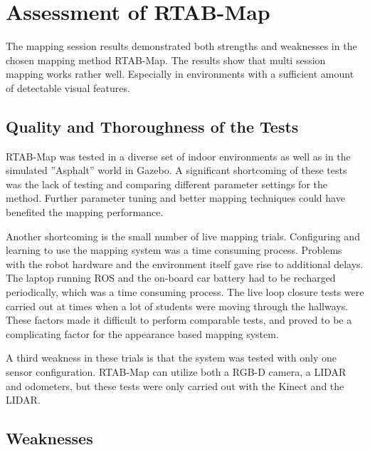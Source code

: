 \section{Assessment of RTAB-Map}

The mapping session results demonstrated both strengths and weaknesses  in the chosen mapping method \ac{RTAB-Map}. The results show that multi session mapping works rather well. Especially in environments with a sufficient amount of detectable visual features. 

\subsection{Quality and Thoroughness of the Tests}

\ac{RTAB-Map} was tested in a diverse set of indoor environments as well as in the simulated ''Asphalt'' world in Gazebo. A significant shortcoming of these tests was the lack of testing and comparing different parameter settings for the method. Further parameter tuning and better mapping techniques could have benefited the mapping performance.

Another shortcoming is the small number of live mapping trials. Configuring and learning to use the mapping system was a time consuming process. Problems with the robot hardware and the environment itself gave rise to additional delays. The laptop running \ac{ROS} and the on-board car battery had to be recharged periodically, which was a time consuming process. The live loop closure tests were carried out at times when a lot of students were moving through the hallways. These factors made it difficult to perform comparable tests, and proved to be a complicating factor for the appearance based mapping system. 

A third weakness in these trials is that the system was tested with only one sensor configuration. \ac{RTAB-Map} can utilize both a RGB-D camera, a LIDAR and odometers, but these tests were only carried out with the Kinect and the LIDAR.

\subsection{Weaknesses}

